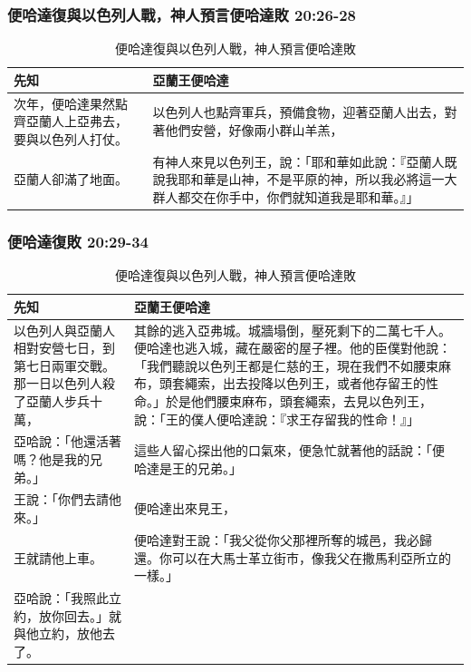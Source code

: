 \subsubsection{便哈達復與以色列人戰，神人預言便哈達敗 20:26-28}
\begin{table}[H]
\centering 
{}
\begin{tabular}{p{4.75cm}|p{}}\hline\hline
先知&亞蘭王便哈達\\\hline
次年，便哈達果然點齊亞蘭人上亞弗去，要與以色列人打仗。&以色列人也點齊軍兵，預備食物，迎著亞蘭人出去，對著他們安營，好像兩小群山羊羔，\\\hline
亞蘭人卻滿了地面。&有神人來見以色列王，說：「耶和華如此說：『亞蘭人既說我耶和華是山神，不是平原的神，所以我必將這一大群人都交在你手中，你們就知道我是耶和華。』」
\\\hline
\end{tabular}
\caption{便哈達復與以色列人戰，神人預言便哈達敗}
\end{table} 


\subsubsection{便哈達復敗 20:29-34}
\begin{table}[H]
\centering 
{}
\begin{tabular}{p{5.95cm}|p{11.5cm}}\hline\hline
先知&亞蘭王便哈達\\\hline
以色列人與亞蘭人相對安營七日，到第七日兩軍交戰。那一日以色列人殺了亞蘭人步兵十萬，&其餘的逃入亞弗城。城牆塌倒，壓死剩下的二萬七千人。便哈達也逃入城，藏在嚴密的屋子裡。他的臣僕對他說：「我們聽說以色列王都是仁慈的王，現在我們不如腰束麻布，頭套繩索，出去投降以色列王，或者他存留王的性命。」於是他們腰束麻布，頭套繩索，去見以色列王，說：「王的僕人便哈達說：『求王存留我的性命！』」\\\hline
亞哈說：「他還活著嗎？他是我的兄弟。」&這些人留心探出他的口氣來，便急忙就著他的話說：「便哈達是王的兄弟。」\\\hline
王說：「你們去請他來。」&便哈達出來見王，\\\hline
王就請他上車。&便哈達對王說：「我父從你父那裡所奪的城邑，我必歸還。你可以在大馬士革立街市，像我父在撒馬利亞所立的一樣。」\\\hline
亞哈說：「我照此立約，放你回去。」就與他立約，放他去了。&\\\hline
\end{tabular}
\caption{便哈達復與以色列人戰，神人預言便哈達敗}
\end{table} 
 
